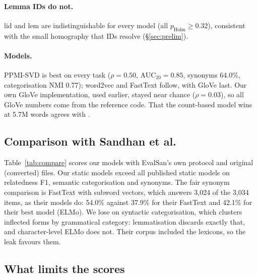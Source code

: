 \documentclass[11pt]{article}
\newcommand{\vk}[1]{\textsf{#1}}
\begin{document}
\paragraph{Lemma IDs do not.} \vk{lid} and \vk{lem} are indistinguishable for
every model (all $p_{\mathrm{Holm}}\ge0.32$), consistent with the small
homography that IDs resolve (\S\ref{sec:prelim}).

\paragraph{Models.} PPMI-SVD is best on every task ($\rho=0.50$,
AUC$_{20}=0.85$, synonyms 64.0\%, categorisation NMI 0.77); word2vec and
FastText follow, with GloVe last. Our own GloVe implementation, used
earlier, stayed near chance ($\rho=0.03$), so all GloVe numbers come from the
reference code. That the count-based model wins at 5.7M words agrees with
\citet{levy2015improving}.

\subsection{Comparison with Sandhan et al.}
Table~\ref{tab:compare} scores our models with EvalSan's own protocol and
original (converted) files. Our static models exceed all published static
models on relatedness F1, semantic categorisation and synonyms. The fair
synonym comparison is FastText with subword vectors, which answers 3,024 of
the 3,034 items, as their models do: 54.0\% against 37.9\% for their
FastText and 42.1\% for their best model (ELMo). We lose on syntactic
categorisation, which clusters inflected forms by grammatical category:
lemmatisation discards exactly that, and character-level ELMo does not.
Their corpus included the lexicons, so the leak favours them.

\begin{table}[t]\centering\footnotesize
\setlength{\tabcolsep}{3.5pt}

\caption{EvalSan's protocol and original files. S\&al.: published numbers
\citep[Table~3]{sandhan2023evalsan}. Ours: leak-free corpus, \vk{lem}
(syntactic categorisation: \vk{seg}). Their protocol skips synonym items with
an OOV word; ``items'' is the number scored.}
\label{tab:compare}
\end{table}

\subsection{What limits the scores}\label{sec:limits}
\end{document}
